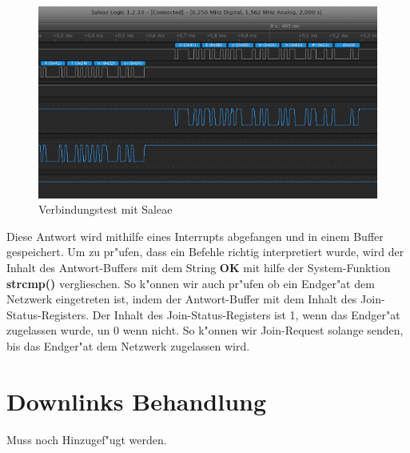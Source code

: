 \begin{figure}[h]
	\centering
	\includegraphics[width=16cm]{source/images/saleae}
	\caption{Verbindungstest mit Saleae\label{fig:saleae}}
\end{figure}

\vspace{5cm}
Diese Antwort wird mithilfe eines Interrupts abgefangen und in einem 
Buffer gespeichert. Um zu pr"ufen, dass ein Befehle richtig interpretiert wurde, wird 
der Inhalt des Antwort-Buffers mit dem String \textbf{OK} mit hilfe der System-Funktion 
\textbf{strcmp()} verglieschen. So k"onnen wir auch pr"ufen ob ein Endger"at dem 
Netzwerk eingetreten ist, indem der Antwort-Buffer mit dem Inhalt des 
Join-Status-Registers. Der Inhalt des Join-Status-Registers ist 1, wenn das Endger"at 
zugelassen wurde, un 0 wenn nicht. So k"onnen wir Join-Request solange senden, bis das 
Endger"at dem Netzwerk zugelassen wird.


\section{Downlinks Behandlung} 

Muss noch Hinzugef"ugt werden.